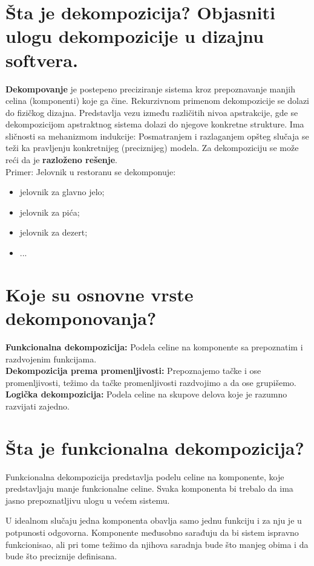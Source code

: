 \documentclass[a4paper]{article}
\begin{document}
\section{Šta je dekompozicija? Objasniti ulogu dekompozicije u dizajnu softvera.}
  \textbf{Dekompovanje} je postepeno preciziranje sistema kroz prepoznavanje manjih celina 
  (komponenti) koje ga čine. Rekurzivnom primenom dekompozicije se dolazi do fizičkog dizajna.
  Predstavlja vezu između različitih nivoa apstrakcije, gde se dekompozicijom apstraktnog
  sistema dolazi do njegove konkretne strukture. Ima sličnosti sa mehanizmom indukcije:
  Posmatranjem i razlaganjem opšteg slučaja se teži ka pravljenju konkretnijeg (preciznijeg)
  modela. Za dekompoziciju se može reći da je \textbf{razloženo rešenje}.\\
  \indent Primer: Jelovnik u restoranu se dekomponuje:
  \begin{itemize}
    \item jelovnik za glavno jelo;
    \item jelovnik za pića;
    \item jelovnik za dezert;
    \item ...
  \end{itemize}

\section{Koje su osnovne vrste dekomponovanja?}
  \textbf{Funkcionalna dekompozicija:} Podela celine na komponente sa prepoznatim i razdvojenim funkcijama.\\

  \textbf{Dekompozicija prema promenljivosti:} Prepoznajemo tačke i ose promenljivosti, težimo da tačke promenljivosti razdvojimo a da ose grupišemo.\\

  \textbf{Logička dekompozicija:} Podela celine na skupove delova koje je razumno razvijati zajedno.

\section{Šta je funkcionalna dekompozicija?}
  Funkcionalna dekompozicija predstavlja podelu celine na komponente, koje predstavljaju manje funkcionalne celine. Svaka komponenta bi trebalo da ima jasno prepoznatljivu ulogu u većem sistemu.

 U idealnom slučaju jedna komponenta obavlja samo jednu funkciju i za nju je u potpunosti odgovorna. Komponente međusobno sarađuju da bi sistem ispravno funkcionisao, ali pri tome težimo da njihova saradnja bude što manjeg obima i da bude što preciznije definisana. 
\end{document}
